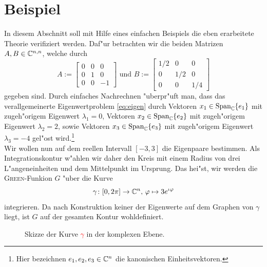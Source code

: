 \newpage
\section{Beispiel}\label{sec:bsp}

In diesem Abschnitt soll mit Hilfe eines einfachen Beispiels die eben erarbeitete
Theorie verifiziert werden. Daf"ur betrachten wir die beiden Matrizen
$A,B \in \mathbb{C}^{n,n}$, welche durch
\[
A:= \begin{bmatrix} 0 & 0 & 0 \\ 0 & 1 & 0 \\ 0 & 0 & -1 \end{bmatrix} \text{ und }
B:= \begin{bmatrix} 1/2 & 0 & 0\\ 0 & 1/2 & 0 \\ 0 & 0 & 1/4 \end{bmatrix}
\]
gegeben sind. Durch einfaches Nachrechnen "uberpr"uft man, dass das
verallgemeinerte Eigenwertproblem \eqref{eq:eigen} durch Vektoren
$x_1 \in \text{Span}_{\mathbb{C}}\{e_1\}$ mit zugeh"origem Eigenwert $\lambda_1 = 0$, Vektoren
$x_2 \in \text{Span}_{\mathbb{C}}\{e_2\}$ mit zugeh"origem Eigenwert $\lambda_2 = 2$, sowie
Vektoren $x_3 \in\text{Span}_{\mathbb{C}}\{e_3\}$ mit zugeh"origem Eigenwert $\lambda_3 = -4$
gel"ost wird.\footnote{Hier bezeichnen $e_1, e_2, e_3 \in\mathbb{C}^n$ die kanonischen Einheitsvektoren.}\\

Wir wollen nun auf dem reellen Intervall $[-3,3]$ die Eigenpaare bestimmen.
Als Integrationskontur w"ahlen wir daher den Kreis mit einem Radius von drei
L"angeneinheiten und dem Mittelpunkt im Ursprung. Das hei"st, wir werden die
\textsc{Green}-Funkion $G$ "uber die Kurve
\begin{equation}\label{kurve}
\gamma\colon [0,2\pi]\to\mathbb{C}^n\text{, }\varphi\mapsto 3e^{\iota \varphi}
\end{equation}
integrieren. Da nach Konstruktion keiner der Eigenwerte auf dem
Graphen von $\gamma$ liegt, ist $G$ auf der gesamten Kontur wohldefiniert.

\begin{figure}[h!]
	\center
	\caption{Skizze der Kurve \textcolor{red}{$\gamma$} in der komplexen Ebene.}
\end{figure}

